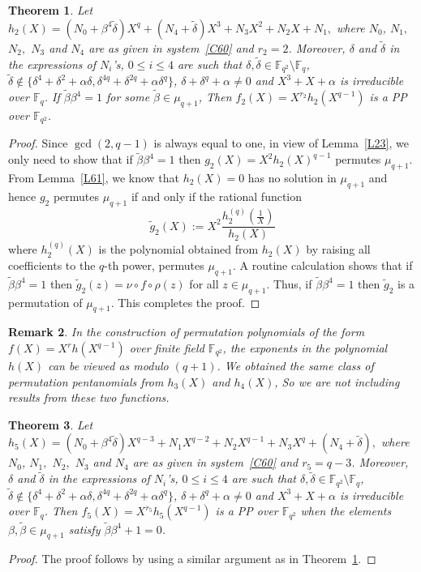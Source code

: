 \documentclass[12pt]{amsart}
\newtheorem{thm}{Theorem}[section]
\newtheorem{rmk}[thm]{Remark}
\numberwithin{equation}{section}
\theoremstyle{definition}
\newcommand{\F}{\mathbb F}
\begin{document}
\begin{thm}\label{T61}
 Let $h_2(X)=(N_0 +\beta^4  {\tilde \delta})X^{q}+(N_4+{\tilde \delta})X^3 +N_3X^2+ N_2X+ N_1,$ where $N_0$, $N_1,$ $N_2,$ $N_3$ and $N_4$ are as given in system~\eqref{C60} and $r_2=2$. Moreover, $\delta$ and $\tilde \delta$ in the expressions of $N_i$'s, $0 \leq i \leq 4$ are such that $\delta, \tilde \delta \in \F_{q^2}\setminus\F_{q}$, $\tilde \delta \not \in \{ \delta^4+\delta^2+\alpha \delta, \delta^{4q}+\delta^{2q}+\alpha \delta^q\}$, $\delta+\delta^q+\alpha \neq 0$ and $X^3+X+\alpha$ is irreducible over $\F_q$.
If ${\tilde \beta}\beta^4=1$ for some ${\tilde \beta} \in \mu_{q+1}$,
Then $f_2(X)=X^{r_2}h_2(X^{q-1})$ is a PP over $\F_{q^2}$.
\end{thm}
\begin{proof}
Since $\gcd(2, q-1)$ is always equal to one, in view of Lemma~\ref{L23}, we only need to show that if ${\tilde \beta}\beta^4=1$ then $g_2(X)=X^2h_2(X)^{q-1}$ permutes $\mu_{q+1}$. From Lemma~\ref{L61}, we know that $h_2(X)=0$ has no solution in $\mu_{q+1}$ and hence $g_2$ permutes $\mu_{q+1}$ if and only if the rational function
\[
 {\tilde g_2}(X):= X^2 \frac{h_2^{(q)} \left( \frac{1}{X}\right)}{h_2(X)}
\]
where $h_2^{(q)}(X)$ is the polynomial obtained from $h_2(X)$ by raising all coefficients to the $q$-th power, permutes $\mu_{q+1}$. A routine calculation shows that if ${\tilde \beta}\beta^4=1$ then ${\tilde g_2}(z) = \nu \circ f \circ \rho (z)$ for all $z \in \mu_{q+1}$. Thus, if ${\tilde \beta}\beta^4=1$ then ${\tilde g_2}$ is a permutation of $\mu_{q+1}$. This completes the proof.
\end{proof}

\begin{rmk}
 In the construction of permutation polynomials of the form $f(X)=X^rh(X^{q-1})$ over finite field $\F_{q^2}$, the exponents in the polynomial $h(X)$ can be viewed as modulo $(q+1)$.
%
 We obtained the same class of permutation pentanomials from $h_3(X)$ and $h_4(X)$, So we are not including results from these two functions.
\end{rmk}


\begin{thm}\label{T64}
 Let $h_5(X) = (N_0 + \beta^4{\tilde \delta})X^{q-3}+N_1X^{q-2}+N_2X^{q-1}+N_3X^q+(N_4+{\tilde \delta}),$ where $N_0$, $N_1,$ $N_2,$ $N_3$ and $N_4$ are as given in system~\eqref{C60} and $r_5=q-3$. Moreover, $\delta$ and $\tilde \delta$ in the expressions of $N_i$'s, $0 \leq i \leq 4$ are such that $\delta, \tilde \delta \in \F_{q^2}\setminus\F_{q}$, $\tilde \delta \not \in \{ \delta^4+\delta^2+\alpha \delta, \delta^{4q}+\delta^{2q}+\alpha \delta^q\}$, $\delta+\delta^q+\alpha \neq 0$ and $X^3+X+\alpha$ is irreducible over $\F_q$. Then $f_5(X)=X^{r_5}h_5(X^{q-1})$ is a PP over $\F_{q^2}$ when the elements $\beta, \tilde{\beta} \in \mu_{q+1}$ satisfy ${\tilde \beta}\beta^4+1=0$.
\end{thm}
\begin{proof}
The proof follows by using a similar argument as in Theorem~\ref{T61}.
\end{proof}
\end{document}
